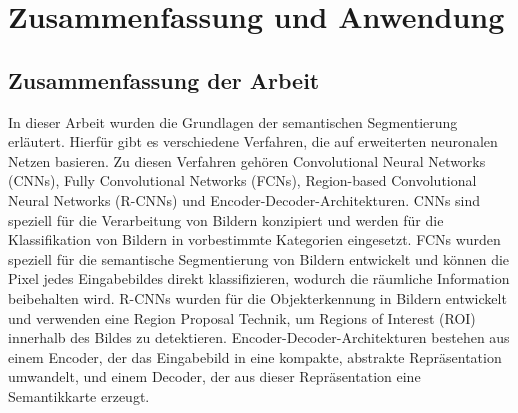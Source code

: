 \chapter{Zusammenfassung und Anwendung}
\section{Zusammenfassung der Arbeit}
In dieser Arbeit wurden die Grundlagen der semantischen Segmentierung
erläutert. Hierfür gibt es verschiedene Verfahren, die auf erweiterten
neuronalen Netzen basieren. Zu diesen Verfahren gehören Convolutional Neural
Networks (CNNs), Fully Convolutional Networks (FCNs), Region-based
Convolutional Neural Networks (R-CNNs) und Encoder-Decoder-Architekturen. CNNs
sind speziell für die Verarbeitung von Bildern konzipiert und werden für die
Klassifikation von Bildern in vorbestimmte Kategorien eingesetzt. FCNs wurden
speziell für die semantische Segmentierung von Bildern entwickelt und können
die Pixel jedes Eingabebildes direkt klassifizieren, wodurch die räumliche
Information beibehalten wird. R-CNNs wurden für die Objekterkennung in Bildern
entwickelt und verwenden eine Region Proposal Technik, um Regions of Interest
(ROI) innerhalb des Bildes zu detektieren. Encoder-Decoder-Architekturen
bestehen aus einem Encoder, der das Eingabebild in eine kompakte, abstrakte
Repräsentation umwandelt, und einem Decoder, der aus dieser Repräsentation eine
Semantikkarte erzeugt.
